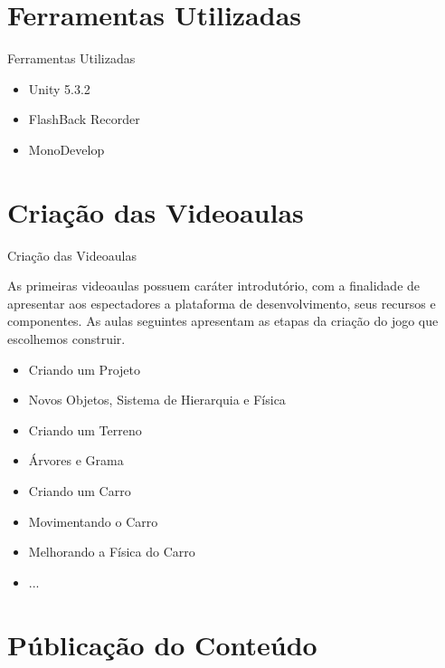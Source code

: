 \documentclass[10pt]{beamer}
\begin{document}
\section{Ferramentas Utilizadas}

\begin{frame}{Ferramentas Utilizadas}

\begin{itemize}
		\item Unity 5.3.2
		\item FlashBack Recorder
		\item MonoDevelop
\end{itemize}

\end{frame}


\section{Criação das Videoaulas}

\begin{frame}{Criação das Videoaulas}

As primeiras videoaulas possuem caráter introdutório, com a finalidade de apresentar aos espectadores a plataforma de desenvolvimento, seus recursos e
componentes. As aulas seguintes apresentam as etapas da criação do jogo que escolhemos construir.

\begin{itemize}
		\item Criando um Projeto
		\item Novos Objetos, Sistema de Hierarquia e Física
		\item Criando um Terreno
		\item Árvores e Grama
		\item Criando um Carro
		\item Movimentando o Carro
		\item Melhorando a Física do Carro
		\item ...
\end{itemize}

\end{frame}


\section{Públicação do Conteúdo}
\end{document}
